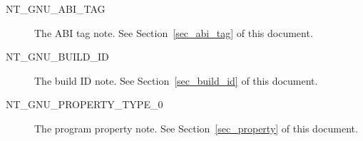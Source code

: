 \begin{description}
 \item[NT_GNU_ABI_TAG]
   The ABI tag note.  See Section~\ref{sec_abi_tag} of this document.
 \item[NT_GNU_BUILD_ID]
   The build ID note.  See Section~\ref{sec_build_id} of this document.
 \item[NT_GNU_PROPERTY_TYPE_0]
   The program property note.  See Section~\ref{sec_property} of this
   document.
\end{description}

